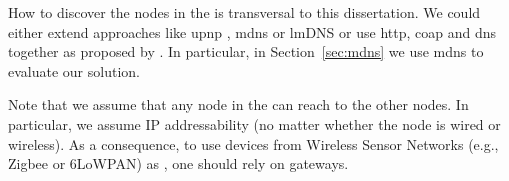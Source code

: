 How to discover the nodes in the \Space{} is transversal to this dissertation.
We could either extend approaches like \ac{upnp} , \ac{mdns}  or lmDNS \citep{jara_light-weight_2012} or use \acs{http}, \ac{coap}  and \ac{dns} together as proposed by \citet{ishaq_facilitating_2012}.
In particular, in Section~\ref{sec:mdns} we use \ac{mdns} to evaluate our solution.

Note that we assume that any node in the \Space{} can reach to the other nodes.
In particular, we assume IP addressability (no matter whether the node is wired or wireless).
As a consequence, to use devices from Wireless Sensor Networks (e.g., Zigbee or 6LoWPAN) as \providers{}, one should rely on gateways.



%
%


